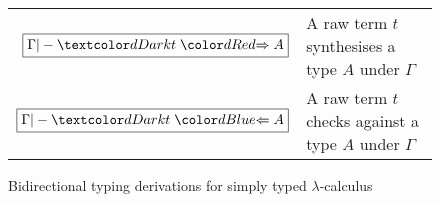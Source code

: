 \begin{figure}
  \small
  \bgroup
  \renewcommand{\arraystretch}{1.5}
  \begin{tabular}{ r l }
    $\boxed{\Gamma |- \isTerm{t} \syn A}$ & A raw term $t$ synthesises a type $A$ under $\Gamma$ \\
    $\boxed{\Gamma |- \isTerm{t} \chk A}$ &A raw term $t$ checks against a type $A$ under $\Gamma$
  \end{tabular}
  \egroup
  \centering
  \caption{Bidirectional typing derivations for simply typed $\lambda$-calculus}
  \label{fig:STLC-bidirectional-typing-derivations}
\end{figure}

